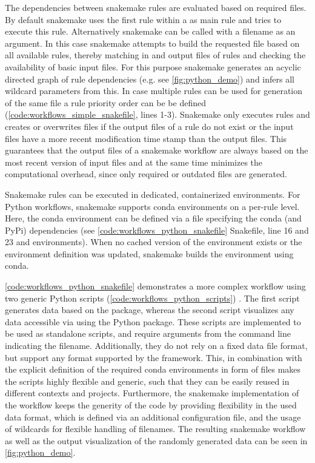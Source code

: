 The dependencies between snakemake rules are evaluated based on required files. By default snakemake uses the first rule within a  as main rule and tries to execute this rule. Alternatively snakemake can be called with a filename as an argument. In this case snakemake attempts to build the requested file based on all available rules, thereby matching in and output files of rules and checking the availability of basic input files. For this purpose snakemake generates an acyclic directed graph of rule dependencies (e.g. see \cref{fig:python_demo}) and infers all wildcard parameters from this. In case multiple rules can be used for generation of the same file a rule priority order can be be defined (\cref{code:workflows_simple_snakefile}, lines 1-3). Snakemake only executes rules and creates or overwrites files if the output files of a rule do not exist or the input files have a more recent modification time stamp than the output files. This guarantees that the output files of a snakemake workflow are always based on the most recent version of input files and at the same time minimizes the computational overhead, since only required or outdated files are generated.

Snakemake rules can be executed in dedicated, containerized environments. For Python workflows, snakemake supports conda environments on a per-rule level. Here, the conda environment can be defined via a  file specifying the conda (and PyPi) dependencies (see \cref{code:workflows_python_snakefile} Snakefile, line 16 and 23 and environments). When no cached version of the environment exists or the  environment definition was updated, snakemake builds the environment using conda.

\cref{code:workflows_python_snakefile} demonstrates a more complex workflow using two generic Python scripts (\cref{code:workflows_python_scripts}) . The first script generates data based on the  package, whereas the second script visualizes any data accessible via  using the Python  package. These scripts are implemented to be used as standalone scripts, and require arguments from the command line indicating the filename. Additionally, they do not rely on a fixed data file format, but support any format supported by the   framework. This, in combination with the explicit definition of the required conda environments in form of  files makes the scripts highly flexible and generic, such that they can be easily reused in different contexts and projects. Furthermore, the snakemake implementation of the workflow keeps the generity of the code by providing flexibility in the used data format, which is defined via an additional configuration  file, and the usage of wildcards for flexible handling of filenames. The resulting snakemake workflow as well as the output visualization of the randomly generated data can be seen in \cref{fig:python_demo}.


